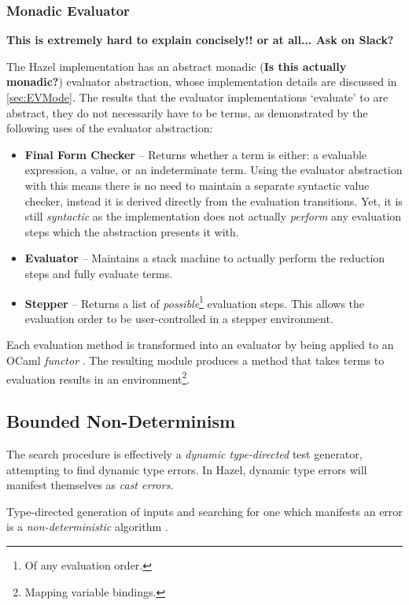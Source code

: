 \subsubsection{Monadic Evaluator}\label{sec:HazelEvaluator}
\textbf{This is extremely hard to explain concisely!! or at all... Ask on Slack?}

The Hazel implementation has an abstract monadic (\textbf{Is this actually monadic?}) evaluator abstraction, whose implementation details are discussed in \cref{sec:EVMode}. The results that the evaluator implementations `evaluate' to are abstract, they do not necessarily have to be terms, as demonstrated by the following uses of the evaluator abstraction:
\begin{itemize}
\item \textbf{Final Form Checker} -- Returns whether a term is either: a evaluable expression, a value, or an indeterminate term. Using the evaluator abstraction with this means there is no need to maintain a separate syntactic value checker, instead it is derived directly from the evaluation transitions. Yet, it is still \textit{syntactic} as the implementation does not actually \textit{perform} any evaluation steps which the abstraction presents it with.
\item \textbf{Evaluator} -- Maintains a stack machine to actually perform the reduction steps and fully evaluate terms.
\item \textbf{Stepper} -- Returns a list of \textit{possible}\footnote{Of any evaluation order.} evaluation steps. This allows the evaluation order to be user-controlled in a stepper environment.
\end{itemize}
Each evaluation method is transformed into an evaluator by being applied to an OCaml \textit{functor} \cite[ch. 10]{RealWorldOCaml}. The resulting module produces a  method that takes terms to evaluation results in an environment\footnote{Mapping variable bindings.}.


\subsection{Bounded Non-Determinism}\label{sec:Nondeterminism}
The search procedure \cite{SearchProc} is effectively a \textit{dynamic type-directed} test generator, attempting to find dynamic type errors. In Hazel, dynamic type errors will manifest themselves as \textit{cast errors}.

Type-directed generation of inputs and searching for one which manifests an error is a \textit{non-deterministic} algorithm \cite{NondeterministicAlgorithms}. 

